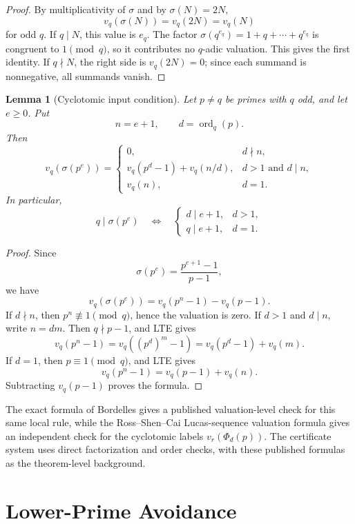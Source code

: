 \documentclass[11pt]{article}
\newtheorem{lemma}[theorem]{Lemma}
\theoremstyle{definition}
\theoremstyle{remark}
\DeclareMathOperator{\ord}{ord}
\begin{document}
\begin{proof}
By multiplicativity of \(\sigma\) and by \(\sigma(N)=2N\),
\[
  v_q(\sigma(N))=v_q(2N)=v_q(N)
\]
for odd \(q\).  If \(q\mid N\), this value is \(e_q\).  The factor
\(\sigma(q^{e_q})=1+q+\cdots+q^{e_q}\) is congruent to \(1\pmod q\), so it
contributes no \(q\)-adic valuation.  This gives the first identity.  If
\(q\nmid N\), the right side is \(v_q(2N)=0\); since each summand is
nonnegative, all summands vanish.
\end{proof}

\begin{lemma}[Cyclotomic input condition]
\label{lem:cyclotomic-input-condition}
Let \(p\ne q\) be primes with \(q\) odd, and let \(e\ge0\).  Put
\[
  n=e+1,\qquad d=\ord_q(p).
\]
Then
\[
  v_q(\sigma(p^e))
  =
  \begin{cases}
  0, & d\nmid n,\\[3pt]
  v_q(p^d-1)+v_q(n/d), & d>1\text{ and }d\mid n,\\[3pt]
  v_q(n), & d=1.
  \end{cases}
\]
In particular,
\[
  q\mid \sigma(p^e)
  \quad\Longleftrightarrow\quad
  \begin{cases}
  d\mid e+1, & d>1,\\
  q\mid e+1, & d=1.
  \end{cases}
\]
\end{lemma}

\begin{proof}
Since
\[
  \sigma(p^e)=\frac{p^{e+1}-1}{p-1},
\]
we have
\[
  v_q(\sigma(p^e))=v_q(p^n-1)-v_q(p-1).
\]
If \(d\nmid n\), then \(p^n\not\equiv1\pmod q\), hence the valuation is zero.
If \(d>1\) and \(d\mid n\), write \(n=dm\).  Then \(q\nmid p-1\), and LTE gives
\[
  v_q(p^n-1)=v_q((p^d)^m-1)=v_q(p^d-1)+v_q(m).
\]
If \(d=1\), then \(p\equiv1\pmod q\), and LTE gives
\[
  v_q(p^n-1)=v_q(p-1)+v_q(n).
\]
Subtracting \(v_q(p-1)\) proves the formula.
\end{proof}

The exact formula of Bordelles \cite{Bordelles2026} gives a published
valuation-level check for this same local rule, while the Ross--Shen--Cai
Lucas-sequence valuation formula \cite{RossShenCai2025} gives an independent
check for the cyclotomic labels \(v_r(\Phi_d(p))\).  The certificate system
uses direct factorization and order checks, with these published formulas as
the theorem-level background.

\section{Lower-Prime Avoidance}
\label{sec:lower-prime-avoidance}
\end{document}
